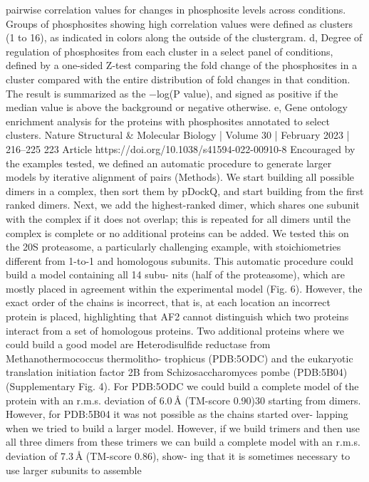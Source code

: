 pairwise correlation values for changes in phosphosite levels across conditions.
Groups of phosphosites showing high correlation values were defined as
clusters (1 to 16), as indicated in colors along the outside of the clustergram.
d, Degree of regulation of phosphosites from each cluster in a select panel of
conditions, defined by a one-sided Z-test comparing the fold change of the
phosphosites in a cluster compared with the entire distribution of fold changes
in that condition. The result is summarized as the −log(P value), and signed as
positive if the median value is above the background or negative otherwise.
e, Gene ontology enrichment analysis for the proteins with phosphosites
annotated to select clusters.
Nature Structural \& Molecular Biology | Volume 30 | February 2023 | 216–225
223
Article
https://doi.org/10.1038/s41594-022-00910-8
Encouraged by the examples tested, we defined an automatic
procedure to generate larger models by iterative alignment of pairs
(Methods). We start building all possible dimers in a complex, then
sort them by pDockQ, and start building from the first ranked dimers.
Next, we add the highest-ranked dimer, which shares one subunit with
the complex if it does not overlap; this is repeated for all dimers until
the complex is complete or no additional proteins can be added. We
tested this on the 20S proteasome, a particularly challenging example,
with stoichiometries different from 1-to-1 and homologous subunits.
This automatic procedure could build a model containing all 14 subu-
nits (half of the proteasome), which are mostly placed in agreement
within the experimental model (Fig. 6). However, the exact order of
the chains is incorrect, that is, at each location an incorrect protein is
placed, highlighting that AF2 cannot distinguish which two proteins
interact from a set of homologous proteins.
Two additional proteins where we could build a good model are
Heterodisulfide reductase from Methanothermococcus thermolitho-
trophicus (PDB:5ODC) and the eukaryotic translation initiation factor
2B from Schizosaccharomyces pombe (PDB:5B04) (Supplementary
Fig. 4). For PDB:5ODC we could build a complete model of the protein
with an r.m.s. deviation of 6.0 Å (TM-score 0.90)30 starting from dimers.
However, for PDB:5B04 it was not possible as the chains started over-
lapping when we tried to build a larger model. However, if we build
trimers and then use all three dimers from these trimers we can build a
complete model with an r.m.s. deviation of 7.3 Å (TM-score 0.86), show-
ing that it is sometimes necessary to use larger subunits to assemble
